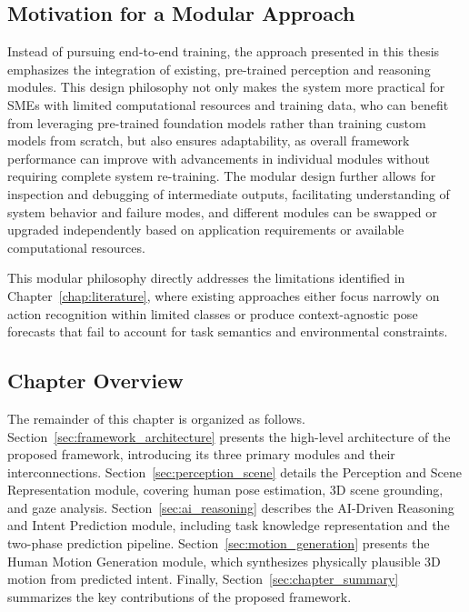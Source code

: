 \subsection{Motivation for a Modular Approach}

Instead of pursuing end-to-end training, the approach presented in this thesis emphasizes the integration of existing, pre-trained perception and reasoning modules. This design philosophy not only makes the system more practical for SMEs with limited computational resources and training data, who can benefit from leveraging pre-trained foundation models rather than training custom models from scratch, but also ensures adaptability, as overall framework performance can improve with advancements in individual modules without requiring complete system re-training. The modular design further allows for inspection and debugging of intermediate outputs, facilitating understanding of system behavior and failure modes, and different modules can be swapped or upgraded independently based on application requirements or available computational resources.

This modular philosophy directly addresses the limitations identified in Chapter~\ref{chap:literature}, where existing approaches either focus narrowly on action recognition within limited classes or produce context-agnostic pose forecasts that fail to account for task semantics and environmental constraints.

\subsection{Chapter Overview}

The remainder of this chapter is organized as follows. Section~\ref{sec:framework_architecture} presents the high-level architecture of the proposed framework, introducing its three primary modules and their interconnections. Section~\ref{sec:perception_scene} details the Perception and Scene Representation module, covering human pose estimation, 3D scene grounding, and gaze analysis. Section~\ref{sec:ai_reasoning} describes the AI-Driven Reasoning and Intent Prediction module, including task knowledge representation and the two-phase prediction pipeline. Section~\ref{sec:motion_generation} presents the Human Motion Generation module, which synthesizes physically plausible 3D motion from predicted intent. Finally, Section~\ref{sec:chapter_summary} summarizes the key contributions of the proposed framework.

